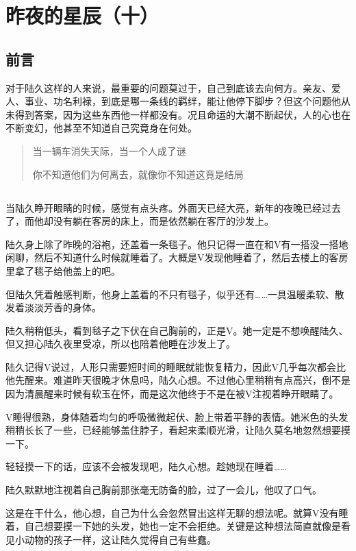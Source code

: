 \chapter{昨夜的星辰（十）}

\section*{前言}

对于陆久这样的人来说，最重要的问题莫过于，自己到底该去向何方。亲友、爱人、事业、功名利禄，到底是哪一条线的羁绊，能让他停下脚步？但这个问题他从未得到答案，因为这些东西他一样都没有。况且命运的大潮不断起伏，人的心也在不断变幻，他甚至不知道自己究竟身在何处。

\begin{verse}
当一辆车消失天际，当一个人成了谜

你不知道他们为何离去，就像你不知道这竟是结局
\end{verse}

\lineseparator

\section*{}

当陆久睁开眼睛的时候，感觉有点头疼。外面天已经大亮，新年的夜晚已经过去了，而他却没有躺在客房的床上，而是依然躺在客厅的沙发上。

陆久身上除了昨晚的浴袍，还盖着一条毯子。他只记得一直在和V有一搭没一搭地闲聊，然后不知道什么时候就睡着了。大概是V发现他睡着了，然后去楼上的客房里拿了毯子给他盖上的吧。

但陆久凭着触感判断，他身上盖着的不只有毯子，似乎还有……一具温暖柔软、散发着淡淡芳香的身体。

陆久稍稍低头，看到毯子之下伏在自己胸前的，正是V。她一定是不想唤醒陆久、但又担心陆久夜里受凉，所以也陪着他睡在沙发上了。

陆久记得V说过，人形只需要短时间的睡眠就能恢复精力，因此V几乎每次都会比他先醒来。难道昨天很晚才休息吗，陆久心想。不过他心里稍稍有点高兴，倒不是因为清晨醒来时候有软玉在怀，而是这次他终于不是在被V注视着睁开眼睛了。

V睡得很熟，身体随着均匀的呼吸微微起伏、脸上带着平静的表情。她米色的头发稍稍长长了一些，已经能够盖住脖子，看起来柔顺光滑，让陆久莫名地忽然想要摸一下。

轻轻摸一下的话，应该不会被发现吧，陆久心想。趁她现在睡着……

陆久默默地注视着自己胸前那张毫无防备的脸，过了一会儿，他叹了口气。

这是在干什么，他心想，自己为什么会忽然冒出这样无聊的想法呢。就算V没有睡着，自己想要摸一下她的头发，她也一定不会拒绝。关键是这种想法简直就像是看见小动物的孩子一样，这让陆久觉得自己有些蠢。

